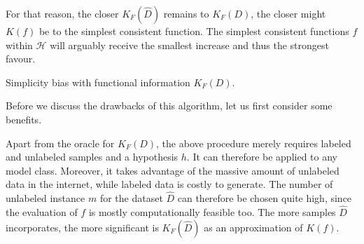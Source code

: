 For that reason, the closer $K_F(\hat{D})$ remains to $K_F(D)$, the closer might $K(f)$ be to the simplest consistent function.
The simplest consistent functions $f$ within $\mathcal{H}$ will arguably receive the smallest increase and thus the strongest favour.
\begin{algorithm}
	\caption{Simplicity bias with functional information $K_F(D)$.}
	\label{alg:simplicity-bias-functional-information}
	\small %
	\raggedright
	\renewcommand{\algorithmicrequire}{\textbf{Given:}} %
	\begin{algorithmic}[1]
	\end{algorithmic}
\end{algorithm}

Before we discuss the drawbacks of this algorithm, let us first consider some benefits.

Apart from the oracle for $K_F(D)$, the above procedure merely requires labeled and unlabeled samples and a hypothesis $h$.
It can therefore be applied to any model class.
Moreover, it takes advantage of the massive amount of unlabeled data in the internet, while labeled data is costly to generate.
The number of unlabeled instance $m$ for the dataset $\hat{D}$ can therefore be chosen quite high, since the evaluation of $f$ is mostly computationally feasible too.
The more samples $\hat{D}$ incorporates, the more significant is $K_F(\hat{D})$ as an approximation of $K(f)$.

